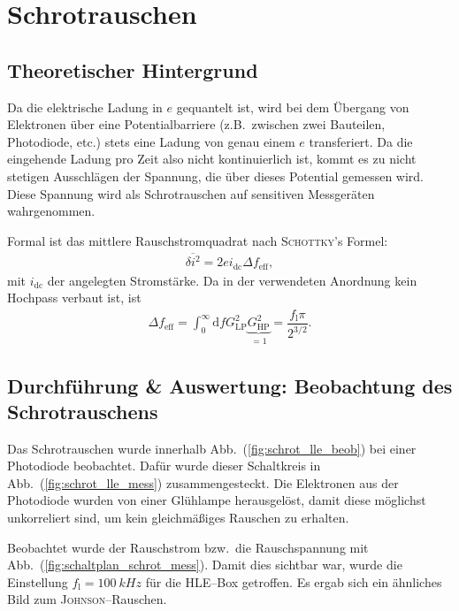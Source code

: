 \documentclass[sn-mathphys-num,iicol]{sn-jnl}
\theoremstyle{thmstyleone}
\theoremstyle{thmstyletwo}
\theoremstyle{thmstylethree}
\newcommand{\td}{\text{d}}
\begin{document}
\section{Schrotrauschen}
\subsection{Theoretischer Hintergrund}
Da die elektrische Ladung in $e$ gequantelt ist, wird bei dem Übergang von Elektronen über eine Potentialbarriere (z.B.\ zwischen zwei Bauteilen, Photodiode, etc.) stets eine Ladung von genau einem $e$ transferiert.
Da die eingehende Ladung pro Zeit also nicht kontinuierlich ist, kommt es zu nicht stetigen Ausschlägen der Spannung, die über dieses Potential gemessen wird.
Diese Spannung wird als Schrotrauschen auf sensitiven Messgeräten wahrgenommen.

Formal ist das mittlere Rauschstromquadrat nach \textsc{Schottky}'s Formel:
\begin{align}
	\overline{\delta i^2}=2ei_\text{dc}\Delta f_\text{eff}
	,\end{align}
mit $i_\text{dc}$ der angelegten Stromstärke.
Da in der verwendeten Anordnung kein Hochpass verbaut ist, ist
\begin{align}
	\Delta f_\text{eff}=\int_{0}^{\infty}\td fG_\text{LP}^2\underbrace{G_\text{HP}^2}_{=1}=\dfrac{f_\text{l}\pi }{2^{3/2}}
	.\end{align}

\subsection{Durchführung \& Auswertung: Beobachtung des Schrotrauschens}
Das Schrotrauschen wurde innerhalb Abb.\ (\ref{fig:schrot_lle_beob}) bei einer Photodiode beobachtet.
Dafür wurde dieser Schaltkreis in Abb.\ (\ref{fig:schrot_lle_mess}) zusammengesteckt.
Die Elektronen aus der Photodiode wurden von einer Glühlampe herausgelöst, damit diese möglichst unkorreliert sind, um kein gleichmäßiges Rauschen zu erhalten.

Beobachtet wurde der Rauschstrom bzw.\ die Rauschspannung mit Abb.\ (\ref{fig:schaltplan_schrot_mess}).
Damit dies sichtbar war, wurde die Einstellung $f_\text{l}=\SI{100}{kHz}$ für die HLE--Box getroffen.
Es ergab sich ein ähnliches Bild zum \textsc{Johnson}--Rauschen. %
\end{document}
